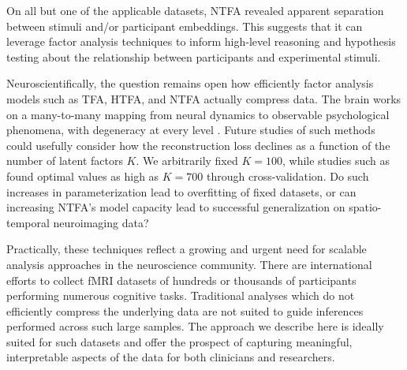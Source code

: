 \documentclass[twoside]{article}
\begin{document}
On all but one of the applicable datasets, NTFA revealed apparent separation between stimuli and/or participant embeddings. This suggests that it can leverage factor analysis techniques to inform high-level reasoning and hypothesis testing about the relationship between participants and experimental stimuli.

Neuroscientifically, the question remains open how efficiently factor analysis models such as TFA, HTFA, and NTFA actually compress data.  The brain works on a many-to-many mapping from neural dynamics to observable psychological phenomena, with degeneracy at every level \citep{Edelman2001,Marder2011}.  Future studies of such methods could usefully consider how the reconstruction loss declines as a function of the number of latent factors $K$.  We arbitrarily fixed $K=100$, while studies such as \cite{manning2018probabilistic} found optimal values as high as $K=700$ through cross-validation.  Do such increases in parameterization lead to overfitting of fixed datasets, or can increasing NTFA's model capacity lead to successful generalization on spatio-temporal neuroimaging data?%

Practically, these techniques reflect a growing and urgent need for scalable analysis approaches in the neuroscience community. There are international efforts to collect fMRI datasets of hundreds or thousands of participants performing numerous cognitive tasks. Traditional analyses which do not efficiently compress the underlying data are not suited to guide inferences performed across such large samples. The approach we describe here is ideally suited for such datasets and offer the prospect of capturing meaningful, interpretable aspects of the data for both clinicians and researchers.





\end{document}
